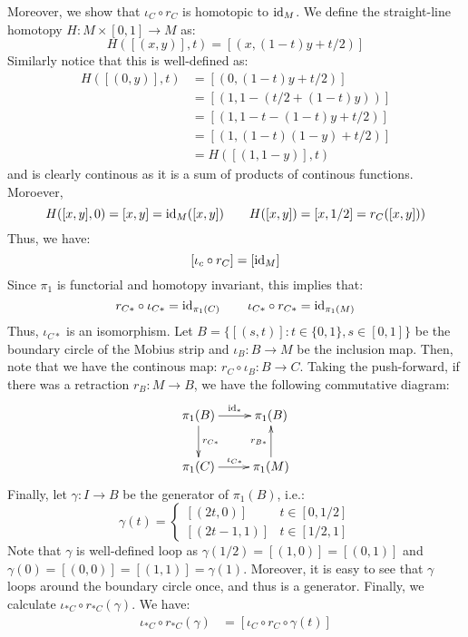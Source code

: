 \documentclass[12pt]{article}
\begin{document}
\begin{solu}
\begin{enumerate}
        Moreover, we show that $\iota_C \circ r_C$ is homotopic to $\operatorname{id}_M$. We define the straight-line homotopy $H: M \times [0, 1] \to M$ as:
        \[H([(x, y)], t) = [(x, (1-t)y + t/2)]\]
        Similarly notice that this is well-defined as:
        \begin{align*}
            H([(0, y)], t) &= [(0, (1-t)y + t/2)] \\
            &= [(1, 1-(t/2+(1-t)y))] \\
            &= [(1, 1-t -(1-t)y + t/2)] \\
            &= [(1, (1-t)(1-y) + t/2)] \\
            &= H([(1, 1-y)], t)
        \end{align*}
        and is clearly continous as it is a sum of products of continous functions. Moroever, 
        \[H([x,y], 0) = [x,y] = \operatorname{id}_M([x,y]) \qquad H([x,y]) = [x,1/2] = r_C([x,y]))\] 
        Thus, we have: 
        \[[\iota_c \circ r_C] = [\operatorname{id}_M]\]
        Since $\pi_1$ is functorial and homotopy invariant, this implies that:
        \[ r_{C*} \circ \iota_{C*} = \operatorname{id}_{\pi_1(C)} \qquad \iota_{C*} \circ r_{C*} = \operatorname{id}_{\pi_1(M)}\]
        Thus, $\iota_{C*}$ is an isomorphism. \bbni 
        Let $B = \{[(s, t)]: t \in \{0, 1\} , s \in [0, 1]\}$ be the boundary circle of the Mobius strip and $\iota_B: B \to M$ be the inclusion map. Then, note that we have the continous map: $r_C \circ \iota_B: B \to C$. Taking the push-forward, if there was a retraction $r_B: M \to B$, we have the following commutative diagram: 
        \[ \xymatrix{ \pi_1(B) \ar[r]^{\id_*} \ar[d]^{r_{C*}} & \pi_1(B)\\ 
        \pi_1(C) \ar[r]^{\iota_{C*}} & \pi_1(M) \ar[u]^{r_{B*}}} \]   
        Finally, let $\gamma: I \to B$ be the generator of $\pi_1(B)$, i.e.:
        \[\gamma(t) = \begin{cases}
            [(2t, 0)] & t \in [0, 1/2] \\
            [(2t-1, 1)] & t \in [1/2, 1]
        \end{cases}\]  
        Note that $\gamma$ is well-defined loop as $\gamma(1/2) = [(1, 0)] = [(0, 1)]$ and $\gamma(0) = [(0, 0)] = [(1, 1)] = \gamma(1)$. Moreover, it is easy to see that $\gamma$ loops around the boundary circle once, and thus is a generator. \bbni 
        Finally, we calculate $\iota_{*C} \circ r_{*C}(\gamma)$. We have:
        \begin{align*}
            \iota_{*C} \circ r_{*C}(\gamma) &= [\iota_C \circ r_C \circ \gamma(t)] \\

\end{align*}
\end{enumerate}
\end{solu}
\end{document}
